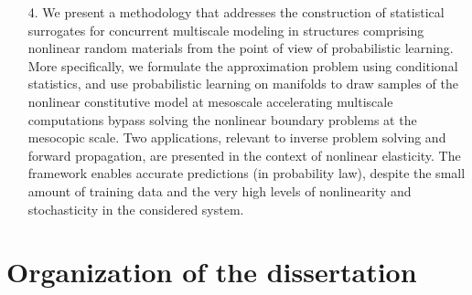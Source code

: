 \begin{itemize}
    \item[4.] We present a methodology that addresses the construction of statistical surrogates for concurrent multiscale modeling in structures comprising nonlinear random materials from the point of view of probabilistic learning. More specifically, we formulate the approximation problem using conditional statistics, and use probabilistic learning on manifolds to draw samples of the nonlinear constitutive model at mesoscale accelerating multiscale computations bypass solving the nonlinear boundary problems at the mesocopic scale. Two applications, relevant to inverse problem solving and forward propagation, are presented in the context of nonlinear elasticity. The framework enables accurate predictions (in probability law), despite the small amount of training data and the very high levels of nonlinearity and stochasticity in the considered system.
\end{itemize}

\section{Organization of the dissertation}


